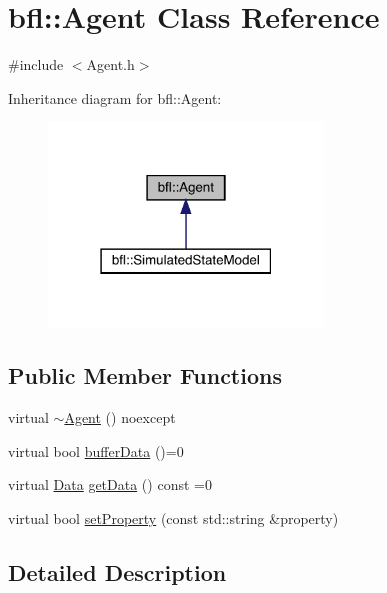 \hypertarget{classbfl_1_1Agent}{}\section{bfl\+:\+:Agent Class Reference}
\label{classbfl_1_1Agent}


{\ttfamily \#include $<$Agent.\+h$>$}



Inheritance diagram for bfl\+:\+:Agent\+:
\nopagebreak
\begin{figure}[H]
\begin{center}
\leavevmode
\includegraphics[width=207pt]{classbfl_1_1Agent__inherit__graph}
\end{center}
\end{figure}
\subsection*{Public Member Functions}
\begin{DoxyCompactItemize}
\item 
virtual \mbox{\hyperlink{classbfl_1_1Agent_acb45ed3a6892a9a66fdb37ad8e883428}{$\sim$\+Agent}} () noexcept
\item 
virtual bool \mbox{\hyperlink{classbfl_1_1Agent_aceb93f1712a98222af2b02537c09b6dc}{buffer\+Data}} ()=0
\item 
virtual \mbox{\hyperlink{namespacebfl_af6b103c6821db1b54452f776fdd9dd02}{Data}} \mbox{\hyperlink{classbfl_1_1Agent_a38522a865006e91ab426fe3bf3a6d4c8}{get\+Data}} () const =0
\item 
virtual bool \mbox{\hyperlink{classbfl_1_1Agent_a1291dcb438c8fc1400e1728711302007}{set\+Property}} (const std\+::string \&property)
\end{DoxyCompactItemize}


\subsection{Detailed Description}


